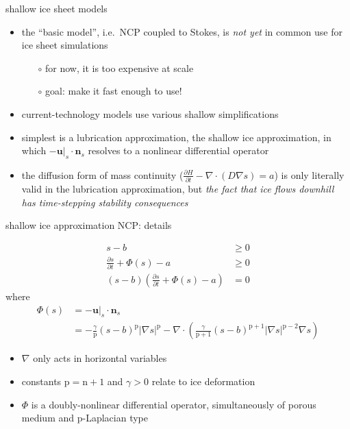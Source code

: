 \documentclass[svgnames,
               hyperref={colorlinks,citecolor=DeepPink4,linkcolor=FireBrick,urlcolor=Maroon},
               usepdftitle=false]  %
               {beamer}
\newcommand{\grad}{\nabla}
\newcommand{\bn}{\mathbf{n}}
\newcommand{\bu}{\mathbf{u}}
\newcommand{\nn}{{\text{n}}}
\newcommand{\pp}{{\text{p}}}
\begin{document}
\begin{frame}{shallow ice sheet models}

\begin{itemize}
\item the ``basic model'', i.e.~NCP coupled to Stokes, is \emph{not yet} in common use for ice sheet simulations
    \begin{itemize}
    \item[$\circ$] for now, it is too expensive at scale
    \item[$\circ$] goal: \alert{make it fast enough to use!}
    \end{itemize}

\smallskip
\item<2-> current-technology models use various shallow simplifications
\item<2-> simplest is a lubrication approximation, the \alert{shallow ice approximation}, in which $- \bu|_s \cdot \bn_s$ resolves to a nonlinear differential operator  

\smallskip
\item<3-> the diffusion form of mass continuity ($\frac{\partial H}{\partial t} - \nabla \cdot \left(D \grad s\right) = a$) is only literally valid in the lubrication approximation, but \emph{the fact that ice flows downhill has time-stepping stability consequences}
\end{itemize}
\end{frame}


\begin{frame}{shallow ice approximation NCP: details}

{\small
\begin{align*}
s - b &\ge 0 \\
\frac{\partial s}{\partial t} + \Phi(s) - a &\ge 0 \\
(s - b) \left(\frac{\partial s}{\partial t} + \Phi(s) - a\right) &= 0
\end{align*}
where
\begin{align*}
\Phi(s) &= - \bu|_s \cdot \bn_s \\
        &= - \frac{\gamma}{\pp} (s-b)^{\pp} |\grad s|^{\pp} - \grad \cdot\left(\frac{\gamma}{\pp+1} (s-b)^{\pp+1} |\grad s|^{\pp-2} \grad s\right)
\end{align*}

\begin{itemize}
\item $\nabla$ only acts in horizontal variables
\item constants $\pp = \nn+1$ and $\gamma > 0$ relate to ice deformation
\item $\Phi$ is a \alert{doubly-nonlinear differential operator}, simultaneously of porous medium and $\pp$-Laplacian type
\end{itemize}
}
\end{frame}
\end{document}
